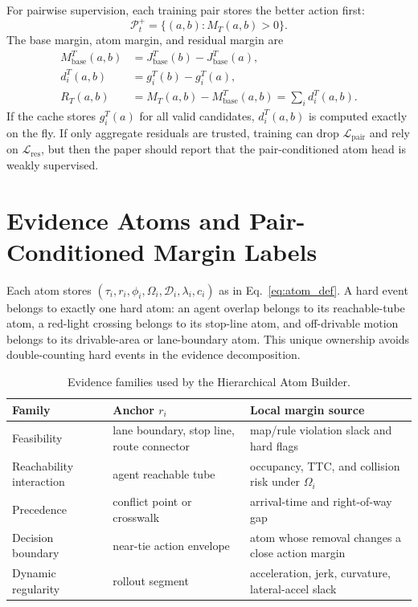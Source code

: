 \documentclass{article}
\begin{document}
For pairwise supervision, each training pair stores the better action first:
\begin{equation}
    \mathcal P_t^+=\{(a,b):M_T(a,b)>0\}.
\end{equation}
The base margin, atom margin, and residual margin are
\begin{align}
    M_{\mathrm{base}}^T(a,b)&=J_{\mathrm{base}}^T(b)-J_{\mathrm{base}}^T(a),\\
    d_i^T(a,b)&=g_i^T(b)-g_i^T(a),\\
    R_T(a,b)&=M_T(a,b)-M_{\mathrm{base}}^T(a,b)=\sum_i d_i^T(a,b).
\end{align}
If the cache stores $g_i^T(a)$ for all valid candidates, $d_i^T(a,b)$ is computed exactly on the fly. If only aggregate residuals are trusted, training can drop $\mathcal L_{\mathrm{pair}}$ and rely on $\mathcal L_{\mathrm{res}}$, but then the paper should report that the pair-conditioned atom head is weakly supervised.

\section{Evidence Atoms and Pair-Conditioned Margin Labels}
\label{app:evidence}

Each atom stores $(\tau_i,r_i,\phi_i,\Omega_i,\mathcal D_i,\lambda_i,c_i)$ as in Eq.~\eqref{eq:atom_def}. A hard event belongs to exactly one hard atom: an agent overlap belongs to its reachable-tube atom, a red-light crossing belongs to its stop-line atom, and off-drivable motion belongs to its drivable-area or lane-boundary atom. This unique ownership avoids double-counting hard events in the evidence decomposition.

\begin{table}[h]
\centering
\caption{Evidence families used by the Hierarchical Atom Builder.}
\label{tab:evidence_families}
\begin{tabular}{lll}
\toprule
Family & Anchor $r_i$ & Local margin source \\
\midrule
Feasibility & lane boundary, stop line, route connector & map/rule violation slack and hard flags \\
Reachability interaction & agent reachable tube & occupancy, TTC, and collision risk under $\Omega_i$ \\
Precedence & conflict point or crosswalk & arrival-time and right-of-way gap \\
Decision boundary & near-tie action envelope & atom whose removal changes a close action margin \\
Dynamic regularity & rollout segment & acceleration, jerk, curvature, lateral-accel slack \\
\bottomrule
\end{tabular}
\end{table}
\end{document}
